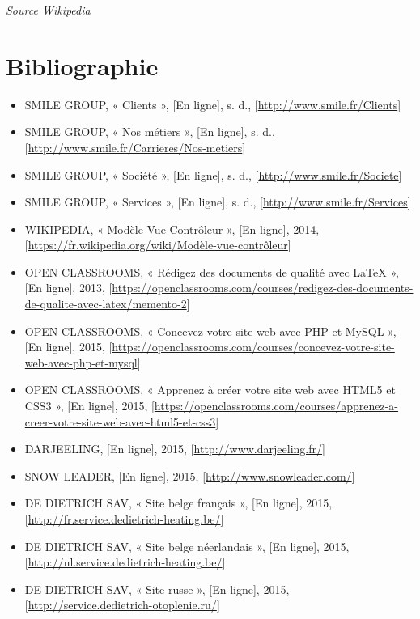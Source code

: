 \documentclass[a4paper,11pt,twoside]{report}
\begin{document}
  \begin{flushright}
    \footnotesize\textit{Source Wikipedia}
  \end{flushright}
  
\chapter*{Bibliographie}
\thispagestyle{\chead{ }}
\begin{itemize}

  \item SMILE GROUP, « Clients », [En ligne], s. d., [\url{http://www.smile.fr/Clients}]
  \item SMILE GROUP, « Nos métiers », [En ligne], s. d., [\url{http://www.smile.fr/Carrieres/Nos-metiers}]
  \item SMILE GROUP, « Société », [En ligne], s. d., [\url{http://www.smile.fr/Societe}]
  \item SMILE GROUP, « Services », [En ligne], s. d., [\url{http://www.smile.fr/Services}]
  \item WIKIPEDIA, « Modèle Vue Contrôleur », [En ligne], 2014, [\url{https://fr.wikipedia.org/wiki/Modèle-vue-contrôleur}]
  \item OPEN CLASSROOMS, « Rédigez des documents de qualité avec LaTeX », [En ligne], 2013, [\url{https://openclassrooms.com/courses/redigez-des-documents-de-qualite-avec-latex/memento-2}]
  \item OPEN CLASSROOMS, « Concevez votre site web avec PHP et MySQL », [En ligne], 2015, [\url{https://openclassrooms.com/courses/concevez-votre-site-web-avec-php-et-mysql}]
  \item OPEN CLASSROOMS, « Apprenez à créer votre site web avec HTML5 et CSS3 », [En ligne], 2015, [\url{https://openclassrooms.com/courses/apprenez-a-creer-votre-site-web-avec-html5-et-css3}]
  \item DARJEELING, [En ligne], 2015, [\url{http://www.darjeeling.fr/}]
  \item SNOW LEADER, [En ligne], 2015, [\url{http://www.snowleader.com/}]
  \item DE DIETRICH SAV, « Site belge français », [En ligne], 2015, [\url{http://fr.service.dedietrich-heating.be/}]
  \item DE DIETRICH SAV, « Site belge néerlandais », [En ligne], 2015, [\url{http://nl.service.dedietrich-heating.be/}]
  \item DE DIETRICH SAV, « Site russe », [En ligne], 2015, [\url{http://service.dedietrich-otoplenie.ru/}]
  
\end{itemize}
  
\listoffigures
\thispagestyle{\chead{ }}
\end{document}
